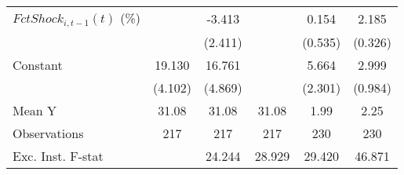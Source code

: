 {\begin{tabular}{l*{5}{c}}
\addlinespace
$ FctShock_{i,t-1}(t)$ (\%)&                     &      -3.413         &                     &       0.154         &       2.185\sym{***}\\
                    &                     &     (2.411)         &                     &     (0.535)         &     (0.326)         \\
\addlinespace
Constant            &      19.130\sym{***}&      16.761\sym{***}&                     &       5.664\sym{**} &       2.999\sym{**} \\
                    &     (4.102)         &     (4.869)         &                     &     (2.301)         &     (0.984)         \\
\midrule
Mean Y              &       31.08         &       31.08         &       31.08         &        1.99         &        2.25         \\
Observations        &         217         &         217         &         217         &         230         &         230         \\
Exc. Inst. F-stat   &                     &      24.244         &      28.929         &      29.420         &      46.871         \\
\bottomrule
\end{tabular}
}
